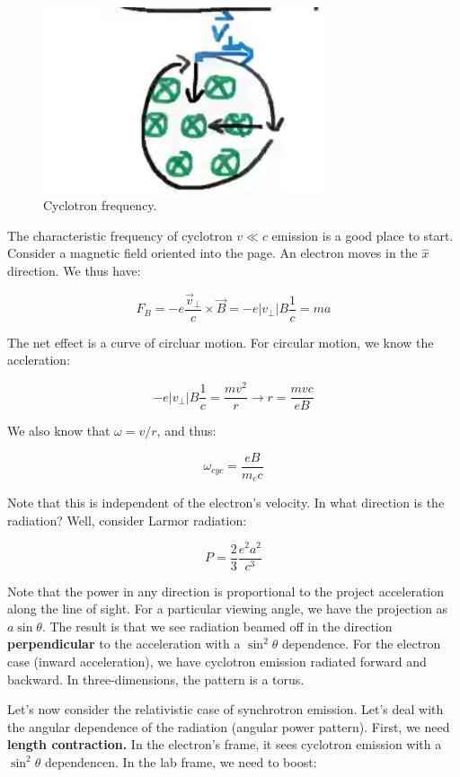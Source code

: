 \documentclass{article}
\def\Bfield{{\vec{B}}}
\begin{document}
\begin{figure}
    \centering
    \includegraphics[width = 0.75\textwidth]{figures/Screen Shot 2020-11-02 at 2.53.09 PM.png}
    \caption{Cyclotron frequency.}
    \label{fig:cycfreq}
\end{figure}

The characteristic frequency of cyclotron $v \ll c$ emission is a good place to start. Consider a magnetic field oriented into the page. An electron moves in the $\hat x$ direction. We thus have:

$$
F_B = -e \frac{\vec v_\perp}{c}\times \Bfield = -e |v_\perp|B\frac{1}{c} = ma
$$

The net effect is a curve of circluar motion. For circular motion, we know the accleration:

$$
-e |v_\perp|B\frac{1}{c} = \frac{mv^2}{r} \rightarrow r = \frac{mvc}{eB}
$$

We also know that $\omega = v/r$, and thus:

$$
\boxed{\omega_{cyc} = \frac{eB}{m_e c}}
$$

Note that this is independent of the electron's velocity. In what direction is the radiation? Well, consider Larmor radiation:

$$
P = \frac23 \frac{e^2 a^2}{c^3}
$$

Note that the power in any direction is proportional to the project acceleration along the line of sight. For a particular viewing angle, we have the projection as $a \sin\theta$. The result is that we see radiation beamed off in the direction \textbf{perpendicular} to the acceleration with a $\sin^2\theta$ dependence. For the electron case (inward acceleration), we have cyclotron emission radiated forward and backward. In three-dimensions, the pattern is a torus. 

Let's now consider the relativistic case of synchrotron emission. Let's deal with the angular dependence of the radiation (angular power pattern). First, we need \textbf{length contraction.} In the electron's frame, it sees cyclotron emission with a $\sin^2\theta$ dependencen. In the lab frame, we need to boost:
\end{document}

